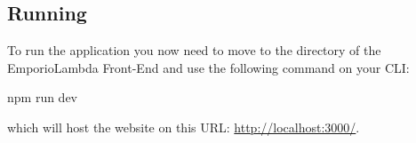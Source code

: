 \subsection{Running}
To run the application you now need to move to the directory of the EmporioLambda Front-End and use the following command on your CLI:
\begin{center}
npm run dev
\end{center}
which will host the website on this URL: \url{http://localhost:3000/}.